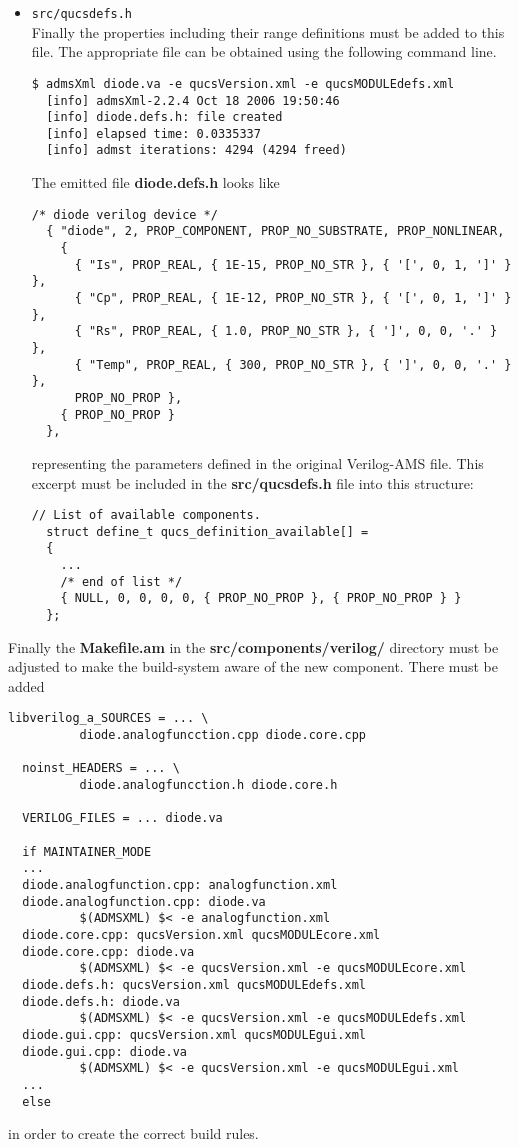 \begin{itemize}
\begin{Verbatim}[fontsize=\small]
    logprint (LOG_ERROR, "no such circuit type `%s'\n", type);
    return NULL;
  }
\end{Verbatim}
\item \Verb+src/qucsdefs.h+\\
Finally the properties including their range definitions must be added
to this file.  The appropriate file can be obtained using the following
command line.
\begin{Verbatim}[fontsize=\small]
  $ admsXml diode.va -e qucsVersion.xml -e qucsMODULEdefs.xml
  [info] admsXml-2.2.4 Oct 18 2006 19:50:46
  [info] diode.defs.h: file created
  [info] elapsed time: 0.0335337
  [info] admst iterations: 4294 (4294 freed)
\end{Verbatim}
The emitted file \textbf{diode.defs.h} looks like
\begin{Verbatim}[fontsize=\small]
  /* diode verilog device */
  { "diode", 2, PROP_COMPONENT, PROP_NO_SUBSTRATE, PROP_NONLINEAR,
    {
      { "Is", PROP_REAL, { 1E-15, PROP_NO_STR }, { '[', 0, 1, ']' } },
      { "Cp", PROP_REAL, { 1E-12, PROP_NO_STR }, { '[', 0, 1, ']' } },
      { "Rs", PROP_REAL, { 1.0, PROP_NO_STR }, { ']', 0, 0, '.' } },
      { "Temp", PROP_REAL, { 300, PROP_NO_STR }, { ']', 0, 0, '.' } },
      PROP_NO_PROP },
    { PROP_NO_PROP }
  },
\end{Verbatim}
representing the parameters defined in the original Verilog-AMS file.
This excerpt must be included in the \textbf{src/qucsdefs.h} file into
this structure:
\begin{Verbatim}[fontsize=\small]
  // List of available components.
  struct define_t qucs_definition_available[] =
  {
    ...
    /* end of list */
    { NULL, 0, 0, 0, 0, { PROP_NO_PROP }, { PROP_NO_PROP } }
  };
\end{Verbatim}
\end{itemize}

Finally the \textbf{Makefile.am} in the
\textbf{src/components/verilog/} directory must be adjusted to make
the build-system aware of the new component.  There must be added
\begin{Verbatim}[fontsize=\small]
  libverilog_a_SOURCES = ... \
          diode.analogfuncction.cpp diode.core.cpp

  noinst_HEADERS = ... \
          diode.analogfuncction.h diode.core.h

  VERILOG_FILES = ... diode.va

  if MAINTAINER_MODE
  ...
  diode.analogfunction.cpp: analogfunction.xml
  diode.analogfunction.cpp: diode.va
          $(ADMSXML) $< -e analogfunction.xml
  diode.core.cpp: qucsVersion.xml qucsMODULEcore.xml
  diode.core.cpp: diode.va
          $(ADMSXML) $< -e qucsVersion.xml -e qucsMODULEcore.xml
  diode.defs.h: qucsVersion.xml qucsMODULEdefs.xml
  diode.defs.h: diode.va
          $(ADMSXML) $< -e qucsVersion.xml -e qucsMODULEdefs.xml
  diode.gui.cpp: qucsVersion.xml qucsMODULEgui.xml
  diode.gui.cpp: diode.va
          $(ADMSXML) $< -e qucsVersion.xml -e qucsMODULEgui.xml
  ...
  else
\end{Verbatim}
in order to create the correct build rules.

